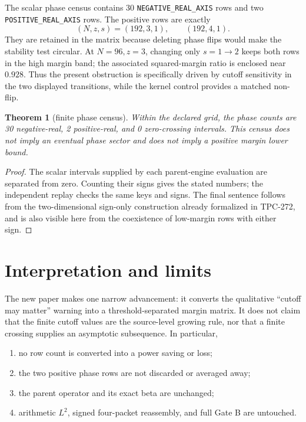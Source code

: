 \documentclass[11pt]{article}
\newtheorem{theorem}{Theorem}
\begin{document}
The scalar phase census contains 30
\texttt{NEGATIVE\_REAL\_AXIS} rows and two
\texttt{POSITIVE\_REAL\_AXIS} rows.  The positive rows are exactly
\[
 (N,z,s)=(192,3,1),\qquad(192,4,1).
\]
They are retained in the matrix because deleting phase flips would make the
stability test circular.  At \(N=96,z=3\), changing only \(s=1\to2\) keeps
both rows in the high margin band; the associated squared-margin ratio is
enclosed near \(0.928\).  Thus the present obstruction is specifically driven
by cutoff sensitivity in the two displayed transitions, while the kernel
control provides a matched non-flip.

\begin{theorem}[finite phase census]
Within the declared grid, the phase counts are 30 negative-real, 2
positive-real, and 0 zero-crossing intervals.  This census does not imply an
eventual phase sector and does not imply a positive margin lower bound.
\end{theorem}

\begin{proof}
The scalar intervals supplied by each parent-engine evaluation are separated
from zero.  Counting their signs gives the stated numbers; the independent
replay checks the same keys and signs.  The final sentence follows from the
two-dimensional sign-only construction already formalized in TPC-272, and is
also visible here from the coexistence of low-margin rows with either sign.
\end{proof}

\section{Interpretation and limits}

The new paper makes one narrow advancement: it converts the qualitative
``cutoff may matter'' warning into a threshold-separated margin matrix.  It
does not claim that the finite cutoff values are the source-level growing
rule, nor that a finite crossing supplies an asymptotic subsequence.  In
particular,

\begin{enumerate}
\item no row count is converted into a power saving or loss;
\item the two positive phase rows are not discarded or averaged away;
\item the parent operator and its exact beta are unchanged;
\item arithmetic \(L^2\), signed four-packet reassembly, and full Gate B are
      untouched.
\end{enumerate}
\end{document}
